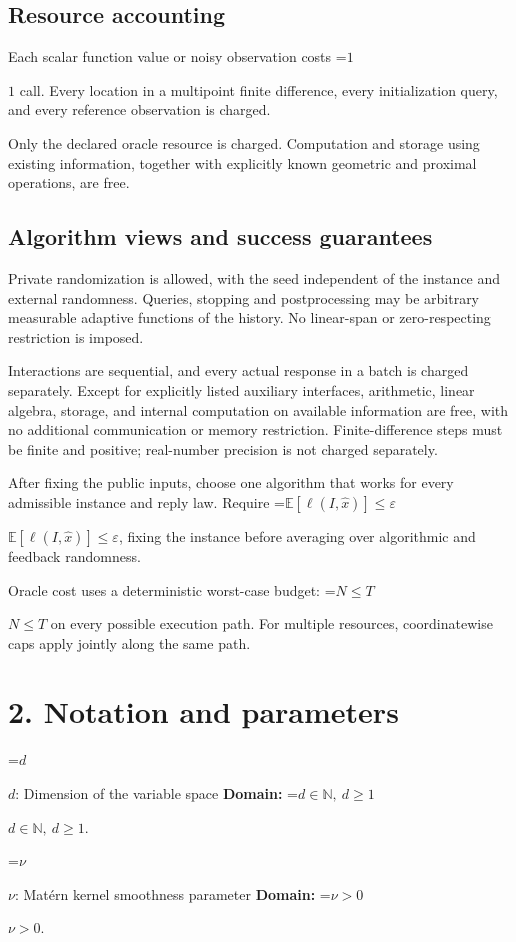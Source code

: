 \documentclass[10pt,a4paper]{article}
\newcommand{\AtlasMath}[1]{\par\begingroup\centering\setbox0=\hbox{$\displaystyle #1$}\ifdim\wd0>1.4\linewidth\typeout{ATLAS WIDE FORMULA: \the\wd0}\fi\ifdim\wd0>\linewidth\resizebox{\linewidth}{!}{\box0}\else\box0\fi\par\endgroup}
\newcommand{\AtlasInlineMath}[1]{\begingroup\setbox0=\hbox{$#1$}\ifdim\wd0>.4\linewidth\endgroup\AtlasMath{#1}\else\endgroup$#1$\fi}
\begin{document}
\subsection{Resource accounting}
Each scalar function value or noisy observation costs \AtlasInlineMath{1} call. Every location in a multipoint finite difference, every initialization query, and every reference observation is charged.

Only the declared oracle resource is charged. Computation and storage using existing information, together with explicitly known geometric and proximal operations, are free.

\subsection{Algorithm views and success guarantees}
Private randomization is allowed, with the seed independent of the instance and external randomness. Queries, stopping and postprocessing may be arbitrary measurable adaptive functions of the history. No linear-span or zero-respecting restriction is imposed.

Interactions are sequential, and every actual response in a batch is charged separately. Except for explicitly listed auxiliary interfaces, arithmetic, linear algebra, storage, and internal computation on available information are free, with no additional communication or memory restriction. Finite-difference steps must be finite and positive; real-number precision is not charged separately.

After fixing the public inputs, choose one algorithm that works for every admissible instance and reply law. Require \AtlasInlineMath{\mathbb{E}[\ell(I,\widehat{x})]\le \varepsilon}, fixing the instance before averaging over algorithmic and feedback randomness.

Oracle cost uses a deterministic worst-case budget: \AtlasInlineMath{N\le T} on every possible execution path. For multiple resources, coordinatewise caps apply jointly along the same path.

\section{2. Notation and parameters}
\AtlasInlineMath{d}: Dimension of the variable space \textbf{Domain:} \AtlasInlineMath{d\in\mathbb{N},\ d\ge1}.

\AtlasInlineMath{\nu}: Matérn kernel smoothness parameter \textbf{Domain:} \AtlasInlineMath{\nu>0}.
\end{document}
